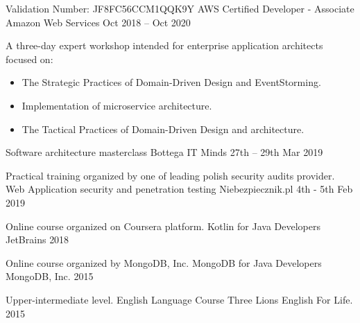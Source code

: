 

\begin{cventries}

  \cventry
    {Validation Number: JF8FC56CCM1QQK9Y} %
    {AWS Certified Developer - Associate} %
    {Amazon Web Services} %
    {Oct 2018 – Oct 2020} %
    {}

  \cventry
    {A three-day expert workshop intended for enterprise application architects focused on: 
\begin{itemize}
  \item The Strategic Practices of Domain-Driven Design and EventStorming.
  \item Implementation of microservice architecture.
  \item The Tactical Practices of Domain-Driven Design and architecture. 
\end{itemize}\vspace*{-\baselineskip} } %
    {Software architecture masterclass} %
    {Bottega IT Minds} %
    {27th – 29th Mar 2019} %
    {}

  \cventry
    {Practical training organized by one of leading polish security audits provider. } %
    {Web Application security and penetration testing} %
    {Niebezpiecznik.pl} %
    {4th - 5th Feb 2019} %
    {}

      
  \cventry
    {Online course organized on Coursera platform. } %
    {Kotlin for Java Developers} %
    {JetBrains} %
    {2018} %
    {}
    
  \cventry
    {Online course organized by MongoDB, Inc. } %
    {MongoDB for Java Developers} %
    {MongoDB, Inc.} %
    {2015} %
    {}
    
  \cventry
    {Upper-intermediate level.} %
    {English Language Course} %
    {Three Lions English For Life.} %
    {2015} %
    {}

\end{cventries}
